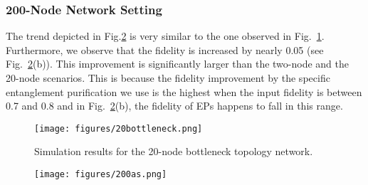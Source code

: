 \subsubsection{200-Node Network Setting}
The trend depicted in Fig.\ref{fig:200as} is very similar to the one observed in Fig.~\ref{fig:20node}.
Furthermore, we observe that the fidelity is increased by nearly 0.05 (see Fig.~\ref{fig:200as}(b)).
This improvement is significantly larger than the two-node and the 20-node scenarios.
This is because the fidelity improvement by the specific entanglement purification we use is the highest when the input fidelity is between 0.7 and 0.8 and in Fig.~\ref{fig:200as}(b), the fidelity of EPs happens to fall in this range.


\begin{figure}
    \centering
    \texttt{[image: figures/20bottleneck.png]}
    \vspace{-0.1in}
    \caption{Simulation results for the 20-node bottleneck topology network.}
    \vspace{-0.1in}
    \label{fig:20node}
\end{figure}

\begin{figure}
    \centering
    \texttt{[image: figures/200as.png]}
    \vspace{-0.1in}
    \caption{}
    \vspace{-0.1in}
    \label{fig:200as}
\end{figure}

